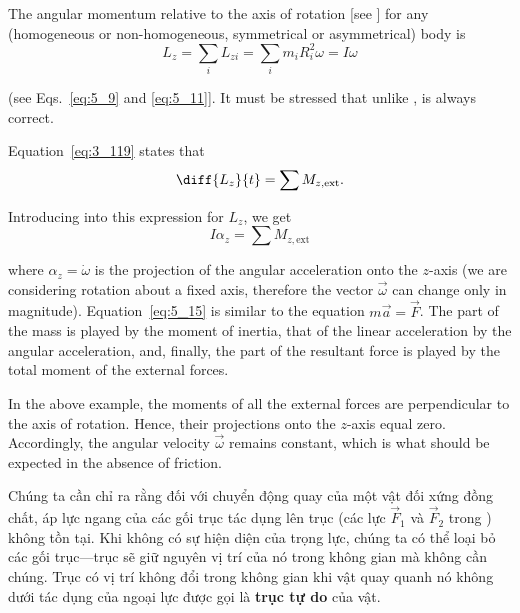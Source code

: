 The angular momentum relative to the axis of rotation [see ] for any (homogeneous or non-homogeneous, symmetrical or asymmetrical) body is
\begin{equation}\label{eq:5_14}
L_z = \sum_i L_{zi} = \sum_i m_i R_i^2 \omega = I \omega
\end{equation}

\noindent
(see Eqs.~\eqref{eq:5_9} and \eqref{eq:5_11}]. It must be stressed that unlike ,  is always correct.

Equation~\eqref{eq:3_119} states that
\begin{equation*}
\diff{L_z}{t} = \sum M_{z,\text{ext}}.
\end{equation*}

\noindent
Introducing into this expression  for $L_z$, we get
\begin{equation}\label{eq:5_15}
I \alpha_z = \sum M_{z,\text{ext}}
\end{equation}

\noindent
where $\alpha_z=\dot{\omega}$ is the projection of the angular acceleration onto the $z$-axis (we are considering rotation about a fixed axis, therefore the vector $\vec{\omega}$ can change only in magnitude). Equation~\eqref{eq:5_15} is similar to the equation $m\vec{a}=\vec{F}$. The part of the mass is played by the moment of inertia, that of the linear acceleration by the angular acceleration, and, finally, the part of the resultant force is played by the total moment of the external forces.

In the above example, the moments of all the external forces are perpendicular to the axis of rotation. Hence, their projections onto the $z$-axis equal zero. Accordingly, the angular velocity $\vec{\omega}$ remains constant, which is what should be expected in the absence of friction.


Chúng ta cần chỉ ra rằng đối với chuyển động quay của một vật đối xứng đồng chất, áp lực ngang của các gối trục tác dụng lên trục (các lực $\vec{F}_1$ và $\vec{F}_2$ trong ) không tồn tại. Khi không có sự hiện diện của trọng lực, chúng ta có thể loại bỏ các gối trục---trục sẽ giữ nguyên vị trí của nó trong không gian mà không cần chúng. Trục có vị trí không đổi trong không gian khi vật quay quanh nó không dưới tác dụng của ngoại lực được gọi là \textbf{trục tự do} của vật.

